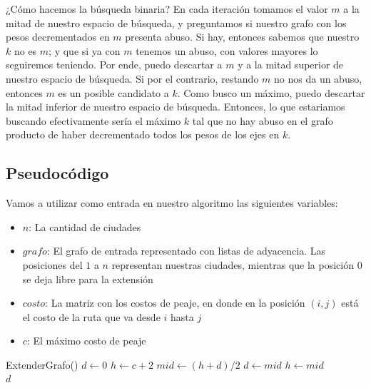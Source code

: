 ¿Cómo hacemos la búsqueda binaria? En cada iteración tomamos el valor $m$ a la mitad de nuestro espacio de búsqueda, y preguntamos si nuestro grafo con los pesos decrementados en $m$ presenta abuso. Si hay, entonces sabemos que nuestro $k$ no es $m$; y que si ya con $m$ tenemos un abuso, con valores mayores lo seguiremos teniendo. Por ende, puedo descartar a $m$ y a la mitad superior de nuestro espacio de búsqueda. Si por el contrario, restando $m$ no nos da un abuso, entonces $m$ es un posible candidato a $k$. Como busco un máximo, puedo descartar la mitad inferior de nuestro espacio de búsqueda. Entonces, lo que estariamos buscando efectivamente sería el máximo $k$ tal que no hay abuso en el grafo producto de haber decrementado todos los pesos de los ejes en $k$. \\

\newpage
\subsection{Pseudocódigo}

Vamos a utilizar como entrada en nuestro algoritmo las siguientes variables:
\begin{itemize}
	\item $n$: La cantidad de ciudades
	\item $grafo$: El grafo de entrada representado con listas de adyacencia. Las posiciones del $1$ a $n$ representan nuestras ciudades, mientras que la posición $0$ se deja libre para la extensión
	\item $costo$: La matriz con los costos de peaje, en donde en la posición $(i,j)$ está el costo de la ruta que va desde $i$ hasta $j$
	\item $c$: El máximo costo de peaje
\end{itemize}

\begin{algorithm}[H]
\begin{algorithmic}
    
	\State ExtenderGrafo()    
    \State $d \gets 0$    
	\State $h \gets c + 2$    
	    
		\State $mid \gets (h + d)/2$    
		    
			\State $d \gets mid$    
		\Else
			\State $h \gets mid$     \\
		\EndIf
	\EndWhile
	\Return $d$    
\EndFunction
\end{algorithmic}
\end{algorithm}


